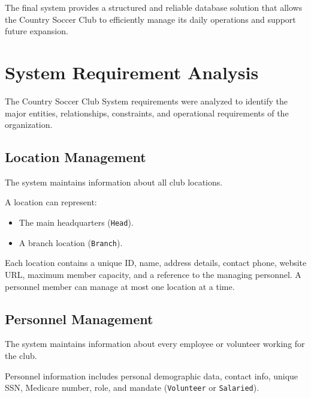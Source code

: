 \documentclass[11pt,a4paper]{article}
\begin{document}
The final system provides a structured and reliable database solution
that allows the Country Soccer Club to efficiently manage its daily
operations and support future expansion.


\section{System Requirement Analysis}


The Country Soccer Club System requirements were analyzed to identify
the major entities, relationships, constraints, and operational
requirements of the organization.



\subsection{Location Management}


The system maintains information about all club locations.


A location can represent:

\begin{itemize}

\item The main headquarters (\texttt{Head}).

\item A branch location (\texttt{Branch}).

\end{itemize}


Each location contains a unique ID, name, address details, contact phone,
website URL, maximum member capacity, and a reference to the managing personnel.
A personnel member can manage at most one location at a time.



\subsection{Personnel Management}


The system maintains information about every employee or volunteer
working for the club.


Personnel information includes personal demographic data, contact info,
unique SSN, Medicare number, role, and mandate (\texttt{Volunteer} or \texttt{Salaried}).
\end{document}
